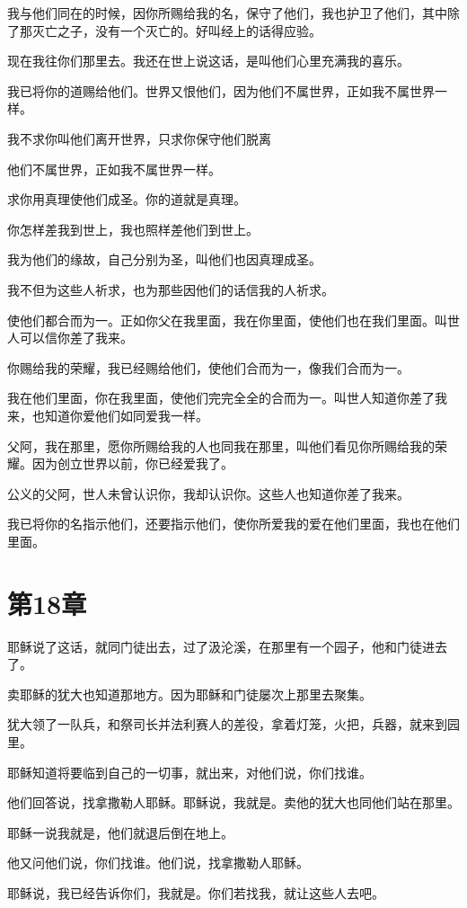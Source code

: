 \documentclass[12pt,oneside]{book}
\begin{document}
我与他们同在的时候，因你所赐给我的名，保守了他们，我也护卫了他们，其中除了那灭亡之子，没有一个灭亡的。好叫经上的话得应验。

现在我往你们那里去。我还在世上说这话，是叫他们心里充满我的喜乐。

我已将你的道赐给他们。世界又恨他们，因为他们不属世界，正如我不属世界一样。

我不求你叫他们离开世界，只求你保守他们脱离

他们不属世界，正如我不属世界一样。

求你用真理使他们成圣。你的道就是真理。

你怎样差我到世上，我也照样差他们到世上。

我为他们的缘故，自己分别为圣，叫他们也因真理成圣。

我不但为这些人祈求，也为那些因他们的话信我的人祈求。

使他们都合而为一。正如你父在我里面，我在你里面，使他们也在我们里面。叫世人可以信你差了我来。

你赐给我的荣耀，我已经赐给他们，使他们合而为一，像我们合而为一。

我在他们里面，你在我里面，使他们完完全全的合而为一。叫世人知道你差了我来，也知道你爱他们如同爱我一样。

父阿，我在那里，愿你所赐给我的人也同我在那里，叫他们看见你所赐给我的荣耀。因为创立世界以前，你已经爱我了。

公义的父阿，世人未曾认识你，我却认识你。这些人也知道你差了我来。

我已将你的名指示他们，还要指示他们，使你所爱我的爱在他们里面，我也在他们里面。

\chapter{第18章}
耶稣说了这话，就同门徒出去，过了汲沦溪，在那里有一个园子，他和门徒进去了。

卖耶稣的犹大也知道那地方。因为耶稣和门徒屡次上那里去聚集。

犹大领了一队兵，和祭司长并法利赛人的差役，拿着灯笼，火把，兵器，就来到园里。

耶稣知道将要临到自己的一切事，就出来，对他们说，你们找谁。

他们回答说，找拿撒勒人耶稣。耶稣说，我就是。卖他的犹大也同他们站在那里。

耶稣一说我就是，他们就退后倒在地上。

他又问他们说，你们找谁。他们说，找拿撒勒人耶稣。

耶稣说，我已经告诉你们，我就是。你们若找我，就让这些人去吧。
\end{document}
